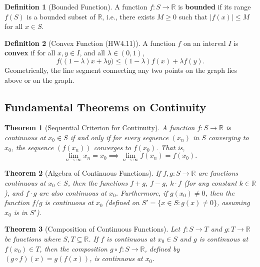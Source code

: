 \documentclass{article}
\theoremstyle{definition}
\newtheorem{definition}{Definition}[section]
\theoremstyle{plain}
\newtheorem{theorem}{Theorem}[section]
\theoremstyle{remark}
\newcommand{\R}{\mathbb{R}}
\begin{document}
\begin{definition}[Bounded Function{\cite[p. 123]{Ross}}]
A function \(f: S \to \R\) is \textbf{bounded} if its range \(f(S)\) is a bounded subset of \(\R\), i.e., there exists \(M \ge 0\) such that \(|f(x)| \le M\) for all \(x \in S\).
\end{definition}

\begin{definition}[Convex Function (HW4.11)]
A function \(f\) on an interval \(I\) is \textbf{convex} if for all \(x,y\in I\), and all \(\lambda \in (0,1)\),
\[ f\big( (1-\lambda) x + \lambda y \big) \leq (1-\lambda) f(x) + \lambda f(y). \]
Geometrically, the line segment connecting any two points on the graph lies above or on the graph.
\end{definition}

\subsection{Fundamental Theorems on Continuity}

\begin{theorem}[Sequential Criterion for Continuity{\cite[Thm 17.2]{Ross}}]
A function \(f: S \to \R\) is continuous at \(x_0 \in S\) if and only if for every sequence \((x_n)\) in \(S\) converging to \(x_0\), the sequence \((f(x_n))\) converges to \(f(x_0)\). That is,
\[ \lim_{n\to\infty} x_n = x_0 \implies \lim_{n\to\infty} f(x_n) = f(x_0). \]
\end{theorem}

\begin{theorem}[Algebra of Continuous Functions{\cite[Thm 17.4]{Ross}}]
If \(f, g: S \to \R\) are functions continuous at \(x_0 \in S\), then the functions \(f+g\), \(f-g\), \(k \cdot f\) (for any constant \(k \in \R\)), and \(f \cdot g\) are also continuous at \(x_0\). Furthermore, if \(g(x_0) \ne 0\), then the function \(f/g\) is continuous at \(x_0\) (defined on \(S' = \{x \in S : g(x) \ne 0\}\), assuming \(x_0\) is in \(S'\)).
\end{theorem}

\begin{theorem}[Composition of Continuous Functions{\cite[Thm 17.5]{Ross}}]
Let \(f: S \to T\) and \(g: T \to \R\) be functions where \(S, T \subseteq \R\). If \(f\) is continuous at \(x_0 \in S\) and \(g\) is continuous at \(f(x_0) \in T\), then the composition \(g \circ f: S \to \R\), defined by \((g \circ f)(x) = g(f(x))\), is continuous at \(x_0\).
\end{theorem}
\end{document}
